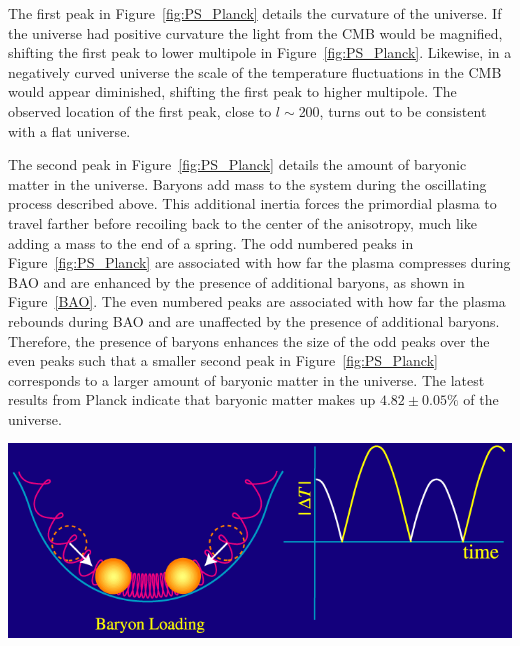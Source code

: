The first peak in Figure~\ref{fig:PS_Planck} details the curvature of the universe. If the universe had positive curvature the light from the CMB would be magnified, shifting the first peak to lower multipole in Figure~\ref{fig:PS_Planck}.  Likewise, in a negatively curved universe the scale of the temperature fluctuations in the CMB would appear diminished, shifting the first peak to higher multipole.  The observed location of the first peak, close to $l\sim$200, turns out to be consistent with a flat universe.  

The second peak in Figure~\ref{fig:PS_Planck} details the amount of baryonic matter in the universe.  Baryons add mass to the system during the oscillating process described above.  This additional inertia forces the primordial plasma to travel farther before recoiling back to the center of the anisotropy, much like adding a mass to the end of a spring.  The odd numbered peaks in Figure~\ref{fig:PS_Planck} are associated with how far the plasma compresses during BAO and are enhanced by the presence of additional baryons, as shown in Figure~\ref{BAO}.  The even numbered peaks are associated with how far the plasma rebounds during BAO and are unaffected by the presence of additional baryons.  Therefore, the presence of baryons enhances the size of the odd peaks over the even peaks such that a smaller second peak in Figure~\ref{fig:PS_Planck} corresponds to a larger amount of baryonic matter in the universe.  The latest results from Planck indicate that baryonic matter makes up $4.82 \pm 0.05\%$ of the universe.


\begin{center} 
\includegraphics[scale=0.7]{BAO.png}
\label{BAO}
\end{center} 

